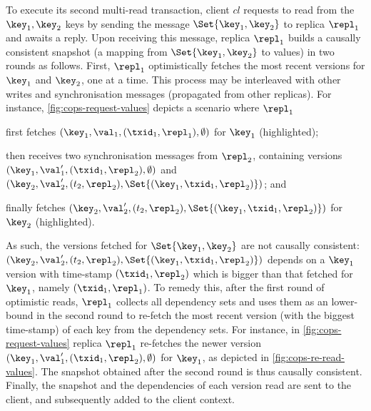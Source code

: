 To execute its second multi-read transaction,
client  \( cl \) requests to read from the $\key_1, \key_2$ keys by sending the message 
\( \Set{\key_1, \key_2} \) to replica $\repl_1$ and awaits a reply.
Upon receiving this message, replica $\repl_1$ builds a causally consistent snapshot (a mapping from $\Set{\key_1, \key_2}$ to values) in two rounds as follows. 
First, $\repl_1$ optimistically fetches the most recent versions for $\key_1$ and $\key_2$,
one at a time. 
This process may be interleaved with other writes and synchronisation messages (propagated from other replicas). 
For instance, \cref{fig:cops-request-values} depicts a scenario where \( \repl_1 \)
\begin{enumerate*}
	\item first fetches \( (\key_1,\val_1,(\txid_1,\repl_1), \emptyset) \) for $\key_1$ (highlighted); %
	\item then receives two synchronisation messages from \( \repl_2 \), 
containing versions \( ( \key_1, \val'_1, (\txid_1,\repl_2),\emptyset ) \) and \( ( \key_2, \val'_2, (t_2,\repl_2),\Set{(\key_1,\txid_1,\repl_2)} ) \); and
	\item finally fetches \( ( \key_2, \val'_2, (t_2,\repl_2),\Set{(\key_1,\txid_1,\repl_2)} ) \) for $\key_2$ (highlighted).
\end{enumerate*}
As such, the versions fetched for \( \Set{\key_1,\key_2}\) are not causally consistent: 
\( ( \key_2, \val'_2, (t_2,\repl_2),\Set{(\key_1,\txid_1,\repl_2)} ) \) depends on a $\key_1$ version with time-stamp $(\txid_1, \repl_2)$ which is bigger than that fetched for $\key_1$, namely $(\txid_1, \repl_1)$.
To remedy this, after the first round of optimistic reads,
$\repl_1$ collects all dependency sets and uses them as an lower-bound in the second round
to re-fetch the most recent version (with the biggest time-stamp) of each key from the dependency sets.
For instance, in \cref{fig:cops-request-values} replica $\repl_1$ re-fetches the newer version \( ( \key_1, \val'_1, (\txid_1,\repl_2),\emptyset ) \) for \( \key_1 \), as depicted in \cref{fig:cops-re-read-values}.
The snapshot obtained after the second round is thus causally consistent. 
Finally, the snapshot and the dependencies of each version read are sent to the client, and subsequently added to the client context.

